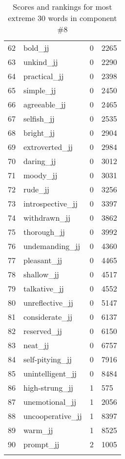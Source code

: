 \begin{longtable}[!htbp]{| rlr@{.}l |}
    62 & bold\_jj & 0 & 2265 \\
    63 & unkind\_jj & 0 & 2290 \\
    64 & practical\_jj & 0 & 2398 \\
    65 & simple\_jj & 0 & 2450 \\
    66 & agreeable\_jj & 0 & 2465 \\
    67 & selfish\_jj & 0 & 2535 \\
    68 & bright\_jj & 0 & 2904 \\
    69 & extroverted\_jj & 0 & 2984 \\
    70 & daring\_jj & 0 & 3012 \\
    71 & moody\_jj & 0 & 3031 \\
    72 & rude\_jj & 0 & 3256 \\
    73 & introspective\_jj & 0 & 3397 \\
    74 & withdrawn\_jj & 0 & 3862 \\
    75 & thorough\_jj & 0 & 3992 \\
    76 & undemanding\_jj & 0 & 4360 \\
    77 & pleasant\_jj & 0 & 4465 \\
    78 & shallow\_jj & 0 & 4517 \\
    79 & talkative\_jj & 0 & 4552 \\
    80 & unreflective\_jj & 0 & 5147 \\
    81 & considerate\_jj & 0 & 6137 \\
    82 & reserved\_jj & 0 & 6150 \\
    83 & neat\_jj & 0 & 6757 \\
    84 & self-pitying\_jj & 0 & 7916 \\
    85 & unintelligent\_jj & 0 & 8484 \\
    86 & high-strung\_jj & 1 & 575 \\
    87 & unemotional\_jj & 1 & 2056 \\
    88 & uncooperative\_jj & 1 & 8397 \\
    89 & warm\_jj & 1 & 8525 \\
    90 & prompt\_jj & 2 & 1005 \\
    \hline
    \caption{Scores and rankings for most extreme 30 words in component \#8} \\
\end{longtable}
